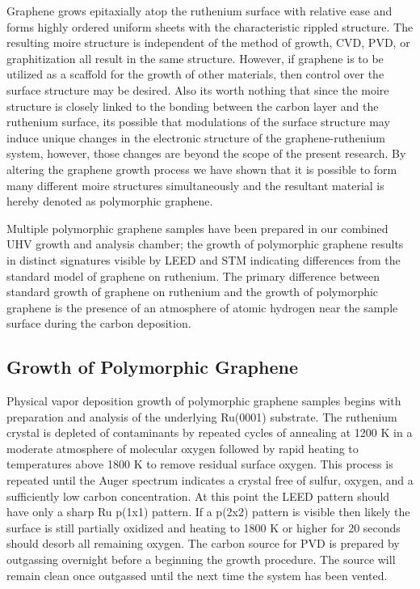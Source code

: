 Graphene grows epitaxially atop the ruthenium surface with relative ease and forms highly ordered uniform sheets with the characteristic rippled structure. The resulting moire structure is independent of the method of growth, CVD, PVD, or graphitization all result in the same structure. However, if graphene is to be utilized as a scaffold for the growth of other materials, then control over the surface structure may be desired. Also its worth nothing that since the moire structure is closely linked to the bonding between the carbon layer and the ruthenium surface, its possible that modulations of the surface structure may induce unique changes in the electronic structure of the graphene-ruthenium system, however, those changes are beyond the scope of the present research. By altering the graphene growth process we have shown that it is possible to form many different moire structures simultaneously and the resultant material is hereby denoted as polymorphic graphene.

Multiple polymorphic graphene samples have been prepared in our combined UHV growth and analysis chamber; the growth of polymorphic graphene results in distinct signatures visible by LEED and STM indicating differences from the standard model of graphene on ruthenium. The primary difference between standard growth of graphene on ruthenium and the growth of polymorphic graphene is the presence of an atmosphere of atomic hydrogen near the sample surface during the carbon deposition.

\subsection{Growth of Polymorphic Graphene}

Physical vapor deposition growth of polymorphic graphene samples begins with preparation and analysis of the underlying Ru(0001) substrate. The ruthenium crystal is depleted of contaminants by repeated cycles of annealing at 1200 K in a moderate atmosphere of molecular oxygen followed by rapid heating to temperatures above 1800 K to remove residual surface oxygen. This process is repeated until the Auger spectrum indicates a crystal free of sulfur, oxygen, and a sufficiently low carbon concentration. At this point the LEED pattern should have only a sharp Ru p(1x1) pattern. If a p(2x2) pattern is visible then likely the surface is still partially oxidized and heating to 1800 K or higher for 20 seconds should desorb all remaining oxygen. The carbon source for PVD is prepared by outgassing overnight before a beginning the growth procedure. The source will remain clean once outgassed until the next time the system has been vented.


